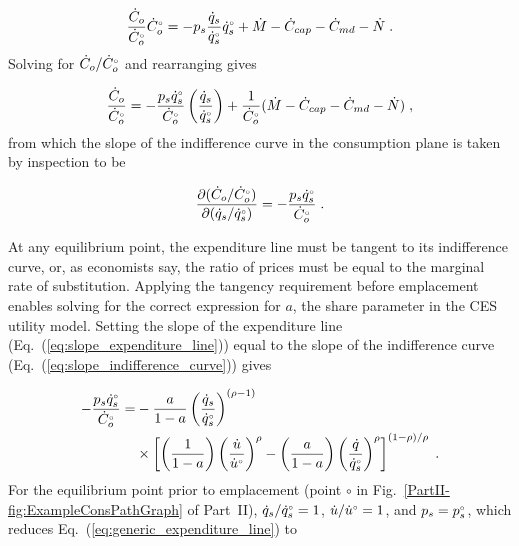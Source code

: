 \documentclass[12pt]{article}\usepackage[]{graphicx}\usepackage[]{xcolor}
\begin{document}
\begin{equation}
  \frac{\dot{C}_o}{{}{\dot{C}}^{\scriptscriptstyle \circ}_o} {}{\dot{C}}^{\scriptscriptstyle \circ}_o = - p_s \frac{\dot{q}_s}{{}{\dot{q}}^{\scriptscriptstyle \circ}_s} {}{\dot{q}}^{\scriptscriptstyle \circ}_s
                        + \dot{M} - \dot{C}_{cap} - \dot{C}_{md}  - \dot{N} \; .
\end{equation}
%
Solving for $\dot{C}_o/{}{\dot{C}}^{\scriptscriptstyle \circ}_o$ and rearranging gives

\begin{equation}
  \frac{\dot{C}_o}{{}{\dot{C}}^{\scriptscriptstyle \circ}_o} = - \frac{p_s {}{\dot{q}}^{\scriptscriptstyle \circ}_s}{{}{\dot{C}}^{\scriptscriptstyle \circ}_o}  
                                        \left( \frac{\dot{q}_s}{{}{\dot{q}}^{\scriptscriptstyle \circ}_s}   \right)
                                    + \frac{1}{{}{\dot{C}}^{\scriptscriptstyle \circ}_o}
                                          (\dot{M} - \dot{C}_{cap} - \dot{C}_{md} - \dot{N}) \; ,
\end{equation}
%
from which the slope of the indifference curve in the consumption plane 
is taken by inspection to be

\begin{equation} \label{eq:slope_expenditure_line}
  \frac{\partial (\dot{C}_o/{}{\dot{C}}^{\scriptscriptstyle \circ}_o)}{\partial (\dot{q}_s/{}{\dot{q}}^{\scriptscriptstyle \circ}_s)} =
              - \frac{p_s {}{\dot{q}}^{\scriptscriptstyle \circ}_s}{{}{\dot{C}}^{\scriptscriptstyle \circ}_o} \; .
\end{equation}

At any equilibrium point, the expenditure line must be
tangent to its indifference curve, or, as economists say,
the ratio of prices must be equal to the marginal rate of substitution.
Applying the tangency requirement before emplacement enables 
solving for the correct expression for $a$, the share parameter in the CES utility model.
Setting the slope of the expenditure line (Eq.~(\ref{eq:slope_expenditure_line}))
equal to the slope of the indifference curve (Eq.~(\ref{eq:slope_indifference_curve})) gives

\begin{align} \label{eq:generic_expenditure_line}
  - \frac{p_s {}{\dot{q}}^{\scriptscriptstyle \circ}_s}{{}{\dot{C}}^{\scriptscriptstyle \circ}_o} =& 
        -\frac{a}{1 - a} \left( \frac{\dot{q}_s}{{}{\dot{q}}^{\scriptscriptstyle \circ}_s} \right)^{(\rho -1)} \nonumber \\
        &\times \left[ \left( \frac{1}{1 - a} \right) \left( \frac{\dot{u}}{{}{\dot{u}}^{\scriptscriptstyle \circ}} \right)^\rho
                - \left( \frac{a}{1 - a} \right) 
                          \left( \frac{\dot{q}}{{}{\dot{q}}^{\scriptscriptstyle \circ}_s} \right)^\rho \right]^{(1 - \rho)/\rho} \; .
\end{align}
%
For the equilibrium point 
prior to emplacement
(point $\circ$
in Fig.~\ref{PartII-fig:ExampleConsPathGraph} of Part~II),
$\dot{q}_s/{}{\dot{q}}^{\scriptscriptstyle \circ}_s = 1$, $\dot{u}/{}{\dot{u}}^{\scriptscriptstyle \circ} = 1$, and
$p_s = {}{p}^{\scriptscriptstyle \circ}_s$, which reduces Eq.~(\ref{eq:generic_expenditure_line}) to
\end{document}

